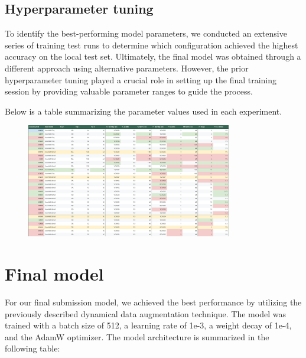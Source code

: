 \documentclass[11pt]{article}
\begin{document}
\begin{multicols}{2}
        \subsection{Hyperparameter tuning}
        
        To identify the best-performing model parameters, we conducted an extensive series of training test runs to determine which configuration achieved the highest accuracy on the local test set. 
        Ultimately, the final model was obtained through a different approach using alternative parameters.
        However, the prior hyperparameter tuning played a crucial role in setting up the final training session by providing valuable parameter ranges to guide the process.
        
        Below is a table summarizing the parameter values used in each experiment.
        
        \begin{figure}[H]
            \centering
            \includegraphics[width=0.8\textwidth]{reports/images/hyperparameter_tuning.pdf}
        \end{figure}
        
        \section{Final model}
        
        For our final submission model, we achieved the best performance by utilizing the previously described dynamical data augmentation technique.
        The model was trained with a batch size of 512, a learning rate of 1e-3, a weight decay of 1e-4, and the AdamW optimizer.
        The model architecture is summarized in the following table:
        

\end{multicols}
\end{document}
